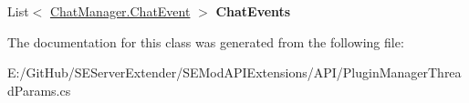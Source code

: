 \begin{DoxyCompactItemize}
\item 
\hypertarget{class_s_e_mod_a_p_i_extensions_1_1_a_p_i_1_1_plugin_manager_thread_params_a7dc9a977489a3c4737e979a59452c0f0}{}List$<$ \hyperlink{struct_s_e_mod_a_p_i_extensions_1_1_a_p_i_1_1_chat_manager_1_1_chat_event}{Chat\+Manager.\+Chat\+Event} $>$ {\bfseries Chat\+Events}\label{class_s_e_mod_a_p_i_extensions_1_1_a_p_i_1_1_plugin_manager_thread_params_a7dc9a977489a3c4737e979a59452c0f0}

\end{DoxyCompactItemize}


The documentation for this class was generated from the following file\+:\begin{DoxyCompactItemize}
\item 
E\+:/\+Git\+Hub/\+S\+E\+Server\+Extender/\+S\+E\+Mod\+A\+P\+I\+Extensions/\+A\+P\+I/Plugin\+Manager\+Thread\+Params.\+cs\end{DoxyCompactItemize}
